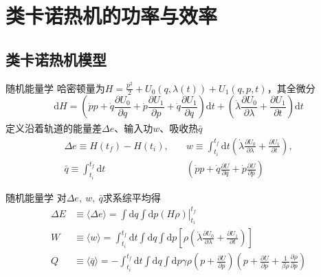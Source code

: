 \documentclass{beamer}
\newcommand{\upcite}[1]{\textsuperscript{\cite{#1}}}  %
\newcommand{\M}[1]{\mathrm{#1}}
\newcommand{\PP}[2]{\frac{\partial #1}{\partial #2}}
\begin{document}
\section{类卡诺热机的功率与效率}
\subsection{类卡诺热机模型}
\begin{frame}{随机能量学}
哈密顿量为$H=\frac{p^{2}}{2}+U_0 (q,\lambda(t)) + U_1 (q,p,t)$，其全微分
\begin{equation}
    \M{d} H=\left(\dot{p} p+\dot{q} \frac{\partial U_0}{\partial q} +  \dot{p} \PP{U_1}{p} + \dot{q} \PP{U_1}{q}  \right) \M{d} t+\left(\dot{\lambda} \frac{\partial U_0}{\partial \lambda} + \PP{U_1}{t} \right) \M{d} t
    \label{eq31.2}
\end{equation}
定义沿着轨道的能量差$\Delta e$\upcite{Tu2013}、输入功$w$\upcite{Sekimoto2010,Jarzynski1997,Sekimoto_1997}、吸收热$\bar{q}$
\begin{equation}
\begin{split}
    \Delta e \equiv H\left(t_{f}\right)-H\left(t_{i}\right),\quad &
    w \equiv \int_{t_{i}}^{t_{f}} \M{d} t \left( \dot{\lambda} \frac{\partial U_0}{\partial \lambda} + \PP{U_1}{t} \right),\\
    \bar{q}\equiv \int_{t_{i}}^{t_{f}}  \M{d} t & \left(\dot{p} p+\dot{q} \frac{\partial U}{\partial q} +  \dot{p} \PP{U}{p}\right)
    \label{eq31.5}
\end{split}
\end{equation}
\end{frame}

\begin{frame}{随机能量学}
对$\Delta e,\ w ,\ \bar{q}$求系综平均得
\begin{align}
    \Delta E &\equiv \langle\Delta e\rangle=\left.\int \M{d} q \int \M{d} p(H \rho)\right|_{t_{i}} ^{t_{f}}\\
    W &\equiv\langle w\rangle=\int_{t_{i}}^{t_{f}} \M{d} t \int \M{d} q \int \M{d} p \left[ \rho\left( \dot{\lambda} \frac{\partial U_0}{\partial \lambda} + \PP{U_1}{t} \right)\right] 
    \\
    Q&\equiv\langle \bar{q}\rangle=-\int_{t_i}^{t_f} \mathrm{d} t \int \mathrm{d} q \int \mathrm{d} p \gamma \rho\left(p+\frac{\partial U}{\partial p}\right)\left(p+\frac{\partial U}{\partial p}+\frac{1}{\beta \rho} \frac{\partial \rho}{\partial p}\right)  
    \label{eq3.12}
\end{align} 
\end{frame}
\end{document}
